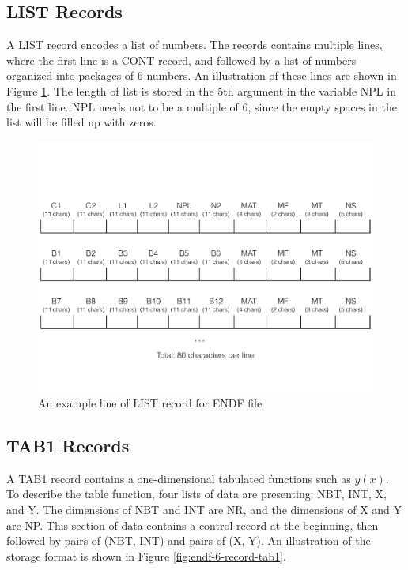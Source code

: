\subsection{LIST Records}
A LIST record encodes a list of numbers. The records contains multiple lines, where the first line is a CONT record, and followed by a list of numbers organized into packages of 6 numbers. An illustration of these lines are shown in Figure \ref{fig:endf-6-record-list}. The length of list is stored in the 5th argument in the variable NPL in the first line. NPL needs not to be a multiple of 6, since the empty spaces in the list will be filled up with zeros.

\begin{figure}[h]
\begin{center}
\includegraphics[scale=0.4]{./pics/endf-6-record-list.pdf}
\end{center}
\caption{ \label{fig:endf-6-record-list}
An example line of LIST record for ENDF file}
\end{figure}

\subsection{TAB1 Records}
A TAB1 record contains a one-dimensional tabulated functions such as $y(x)$. To describe the table function, four lists of data are presenting: NBT, INT, X, and Y. The dimensions of NBT and INT are NR, and the dimensions of X and Y are NP. This section of data contains a control record at the beginning, then followed by pairs of (NBT, INT) and pairs of (X, Y). An illustration of the storage format is shown in Figure \ref{fig:endf-6-record-tab1}.

